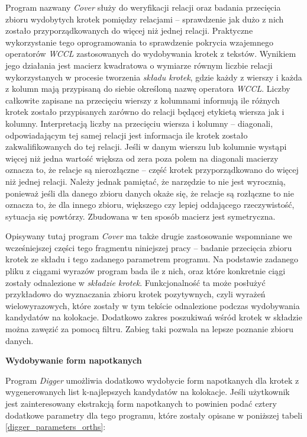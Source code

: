 \documentclass[11pt,a4paper]{llncs}
\begin{document}
Program nazwany \emph{Cover} służy do weryfikacji relacji oraz badania przecięcia zbioru wydobytych krotek pomiędzy relacjami -- sprawdzenie jak dużo z nich zostało przyporządkowanych do więcej niż jednej relacji.
Praktyczne wykorzystanie tego oprogramowania to sprawdzenie pokrycia wzajemnego operatorów \emph{WCCL} zastosowanych do wydobywania krotek z tekstów.
Wynikiem jego działania jest macierz kwadratowa o wymiarze równym liczbie relacji wykorzystanych w procesie tworzenia \emph{składu krotek}, gdzie każdy z wierszy i każda z kolumn mają przypisaną do siebie określoną nazwę operatora \emph{WCCL}.
Liczby całkowite zapisane na przecięciu wierszy z kolumnami informują ile różnych krotek zostało przypisanych zarówno do relacji będącej etykietą wiersza jak i kolumny.
Interpretacją liczby na przecięciu wiersza i kolumny -- diagonali, odpowiadającym tej samej relacji jest informacja ile krotek zostało zakwalifikowanych do tej relacji.
Jeśli w danym wierszu lub kolumnie wystąpi więcej niż jedna wartość większa od zera poza polem na diagonali macierzy oznacza to, że relacje są nierozłączne -- część krotek przyporządkowano do więcej niż jednej relacji.
Należy jednak pamiętać, że narzędzie to nie jest wyrocznią, ponieważ jeśli dla danego zbioru danych okaże się, że relacje są rozłączne to nie oznacza to, że dla innego zbioru, większego czy lepiej oddającego rzeczywistość, sytuacja się powtórzy.
Zbudowana w ten sposób macierz jest symetryczna.
\par
Opisywany tutaj program \emph{Cover} ma także drugie zastosowanie wspomniane we wcześniejszej części tego fragmentu niniejszej pracy -- badanie przecięcia zbioru krotek ze składu i tego zadanego parametrem programu.
Na podstawie zadanego pliku z ciągami wyrazów program bada ile z nich, oraz które konkretnie ciągi zostały odnalezione w \emph{składzie krotek}.
Funkcjonalność ta może posłużyć przykładowo do wyznaczania zbioru krotek pozytywnych, czyli wyrażeń wielowyrazowych, które zostały w tym tekście odnalezione podczas wydobywania kandydatów na kolokacje.
Dodatkowo zakres poszukiwań wśród krotek w składzie można zawęzić za pomocą filtru.
Zabieg taki pozwala na lepsze poznanie zbioru danych.


\noindent\textbf{Wydobywanie form napotkanych}


Program \emph{Digger} umożliwia dodatkowo wydobycie form napotkanych dla krotek z wygenerowanych list k-najlepszych kandydatów na kolokacje.
Jeśli użytkownik jest zainteresowany ekstrakcją form napotkanych to powinien podać cztery dodatkowe parametry dla tego programu, które zostały opisane w poniższej tabeli \ref{digger_parameters_orths}:
\end{document}
